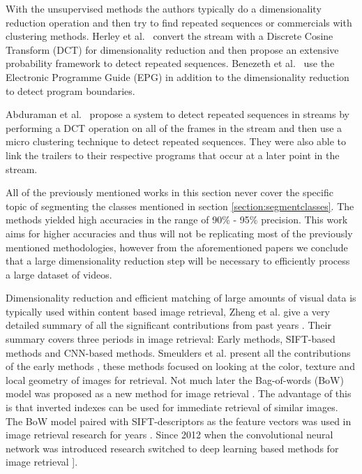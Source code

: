\documentclass{article}
\begin{document}
With the unsupervised methods the authors typically do a dimensionality reduction operation and then try to find repeated sequences or commercials with clustering methods. Herley et al.\ \cite{herley2006argos} convert the stream with a Discrete Cosine Transform (DCT) for dimensionality reduction and then propose an extensive probability framework to detect repeated sequences. Benezeth et al.\ \cite{benezeth2010unsupervised} use the Electronic Programme Guide (EPG) in addition to the dimensionality reduction to detect program boundaries.

Abduraman et al.\ \cite{abduraman2011unsupervised} propose a system to detect repeated sequences in streams by performing a DCT operation on all of the frames in the stream and then use a micro clustering technique to detect repeated sequences. They were also able to link the trailers to their respective programs that occur at a later point in the stream.

All of the previously mentioned works in this section never cover the specific topic of segmenting the classes mentioned in section \ref{section:segmentclasses}. The methods yielded high accuracies in the range of 90\% - 95\% precision. This work aims for higher accuracies and thus will not be replicating most of the previously mentioned methodologies, however from the aforementioned papers we conclude that a large dimensionality reduction step will be necessary to efficiently process a large dataset of videos.

Dimensionality reduction and efficient matching of large amounts of visual data is typically used within content based image retrieval, Zheng et al. give a very detailed summary of all the significant contributions from past years \cite{zheng2018sift}. Their summary covers three periods in image retrieval: Early methods, SIFT-based methods and CNN-based methods. Smeulders et al. present all the contributions of the early methods \cite{smeulders2000content}, these methods focused on looking at the color, texture and local geometry of images for retrieval. Not much later the Bag-of-words (BoW) model was proposed as a new method for image retrieval \cite{sivic2003video}. The advantage of this is that inverted indexes can be used for immediate retrieval of similar images. The BoW model paired with SIFT-descriptors \cite{lowe2004distinctive} as the feature vectors was used in image retrieval research for years \cite{nister2006scalable}\cite{philbin2007object}\cite{jegou2008hamming}\cite{jegou2010aggregating}\cite{jegou2012aggregating}. Since 2012 when the convolutional neural network was introduced \cite{krizhevsky2012imagenet} research switched to deep learning based methods for image retrieval \cite{babenko2014neural}]\cite{yue2015exploiting}\cite{tolias2015particular}.
\end{document}
